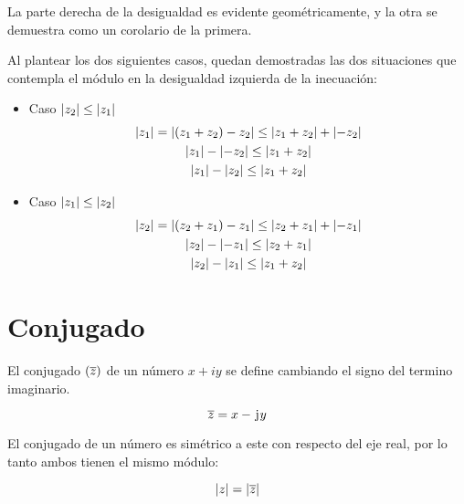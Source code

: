
La parte derecha de la desigualdad es evidente geométricamente, y la otra se demuestra como un corolario de la primera.

Al plantear los dos siguientes casos, quedan demostradas las dos situaciones que contempla el módulo en la desigualdad izquierda de la inecuación:

\begin{itemize}
    \item Caso ${\left| {z_2} \right|} \leq {\left| {z_1} \right|}$
    \begin{gather*}
        {\left| {z_1} \right|} = {\left| {(z_1+z_2)-z_2} \right|} \leq {\left| {z_1+z_2} \right|}+{\left| {-z_2} \right|}
        \\
        {\left| {z_1} \right|} - {\left| {-z_2} \right|} \leq {\left| {z_1+z_2} \right|}
        \\
        {\left| {z_1} \right|} - {\left| {z_2} \right|} \leq {\left| {z_1+z_2} \right|}
    \end{gather*}

    \item Caso ${\left| {z_1} \right|} \leq {\left| {z_2} \right|}$
    \begin{gather*}
        {\left| {z_2} \right|} = {\left| {(z_2+z_1)-z_1} \right|} \leq {\left| {z_2+z_1} \right|}+{\left| {-z_1} \right|}
        \\
        {\left| {z_2} \right|} - {\left| {-z_1} \right|} \leq {\left| {z_2+z_1} \right|}
        \\
        {\left| {z_2} \right|} - {\left| {z_1} \right|} \leq {\left| {z_1+z_2} \right|}
    \end{gather*}
\end{itemize}


\section{Conjugado}

El conjugado $(\overline{z})$ de un número $x+iy$ se define cambiando el signo del termino imaginario.

\begin{mdframed}[style=DefinitionFrame]
    \begin{defn}
        \label{defn:conjugate}
    \end{defn}
    \begin{equation*}
        \overline{z} = x - \mkern2mu\mathrm{j}\mkern1mu y
    \end{equation*}
\end{mdframed}

El conjugado de un número es simétrico a este con respecto del eje real, por lo tanto ambos tienen el mismo módulo:

\begin{mdframed}[style=PropertyFrame]
    \begin{prop}
    \end{prop}
    \begin{equation*}
        {\left| {z} \right|} = {\left| {\overline{z}} \right|}
    \end{equation*}
\end{mdframed}

